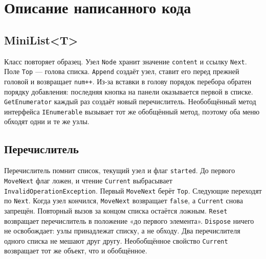 \documentclass[a4paper,14pt]{extarticle}
\begin{document}
\section{Описание написанного кода}
\subsection{MiniList<T>}
Класс повторяет образец. Узел \texttt{Node} хранит значение \texttt{content} и ссылку \texttt{Next}. Поле \texttt{Top} — голова списка. \texttt{Append} создаёт узел, ставит его перед прежней головой и возвращает \texttt{num++}. Из-за вставки в голову порядок перебора обратен порядку добавления: последняя кнопка на панели оказывается первой в списке.
\texttt{GetEnumerator} каждый раз создаёт новый перечислитель. Необобщённый метод интерфейса \texttt{IEnumerable} вызывает тот же обобщённый метод, поэтому оба меню обходят одни и те же узлы.
\subsection{Перечислитель}
Перечислитель помнит список, текущий узел и флаг \texttt{started}. До первого \texttt{MoveNext} флаг ложен, и чтение \texttt{Current} выбрасывает \texttt{InvalidOperationException}. Первый \texttt{MoveNext} берёт \texttt{Top}. Следующие переходят по \texttt{Next}. Когда узел кончился, \texttt{MoveNext} возвращает \texttt{false}, а \texttt{Current} снова запрещён. Повторный вызов за концом списка остаётся ложным. \texttt{Reset} возвращает перечислитель в положение «до первого элемента». \texttt{Dispose} ничего не освобождает: узлы принадлежат списку, а не обходу. Два перечислителя одного списка не мешают друг другу.
Необобщённое свойство \texttt{Current} возвращает тот же объект, что и обобщённое.
\end{document}
